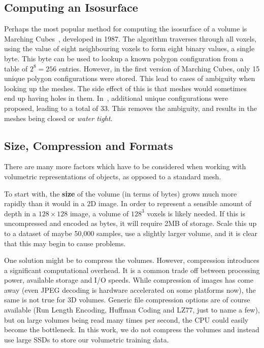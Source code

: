 \subsection{Computing an Isosurface}

Perhaps the most popular method for computing the isosurface of a
volume is Marching Cubes~\cite{lorensen1987marching}, developed in
1987. The algorithm traverses through all voxels, using the value of
eight neighbouring voxels to form eight binary values, a single
byte. This byte can be used to lookup a known polygon configuration
from a table of $2^8 = 256$ entries. However, in the first version of
Marching Cubes, only 15 unique polygon configurations were
stored. This lead to cases of ambiguity when looking up the
meshes. The side effect of this is that meshes would sometimes end up
having holes in them. In~\cite{chernyaev1995marching}, additional
unique configurations were proposed, leading to a total of 33. This
removes the ambiguity, and results in the meshes being closed or
\textit{water tight}.


\subsection{Size, Compression and Formats}
\label{sec:background:volstorage}

There are many more factors which have to be considered when working
with volumetric representations of objects, as opposed to a standard
mesh.

To start with, the \textbf{size} of the volume (in terms of bytes)
grows much more rapidly than it would in a 2D image. In order to
represent a sensible amount of depth in a $128 \times 128$ image, a
volume of $128^3$ voxels is likely needed. If this is uncompressed and
encoded as bytes, it will require 2MB of storage. Scale this up to a
dataset of maybe 50,000 samples, use a slightly larger volume, and it
is clear that this may begin to cause problems.

One solution might be to compress the volumes. However, compression
introduces a significant computational overhead. It is a common trade
off between processing power, available storage and I/O speeds. While
compression of images has come away (even JPEG decoding is hardware
accelerated on some platforms now), the same is not true for 3D
volumes. Generic file compression options are of course available (Run
Length Encoding, Huffman Coding and LZ77, just to name a few), but on
large volumes being read many times per second, the CPU could easily
become the bottleneck. In this work, we do not compress the volumes
and instead use large SSDs to store our volumetric training data.

